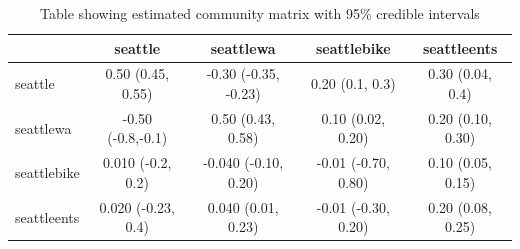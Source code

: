 \documentclass[12pt]{memoir}
\begin{document}
\begin{table}[h]
\footnotesize
\begin{tabular}{l | c c c c}
  & seattle & seattlewa & seattlebike & seattleents \\ \hline
  seattle & 0.50 (0.45, 0.55) & -0.30 (-0.35, -0.23) & 0.20 (0.1, 0.3) & 0.30 (0.04, 0.4) \\
  seattlewa & -0.50 (-0.8,-0.1) & 0.50 (0.43, 0.58) & 0.10 (0.02, 0.20) & 0.20 (0.10, 0.30) \\
  seattlebike & 0.010 (-0.2, 0.2) & -0.040 (-0.10, 0.20) & -0.01 (-0.70, 0.80) & 0.10 (0.05, 0.15) \\
  seattleents & 0.020 (-0.23, 0.4) & 0.040 (0.01, 0.23) & -0.01 (-0.30, 0.20) & 0.20 (0.08, 0.25) \\ \hline
\end{tabular}
\caption{Table showing estimated community matrix with 95\% credible intervals}
\end{table}

\setcounter{biburlnumpenalty}{9001}
\printbibliography[title = {References}, heading=secbib]
\end{document}
